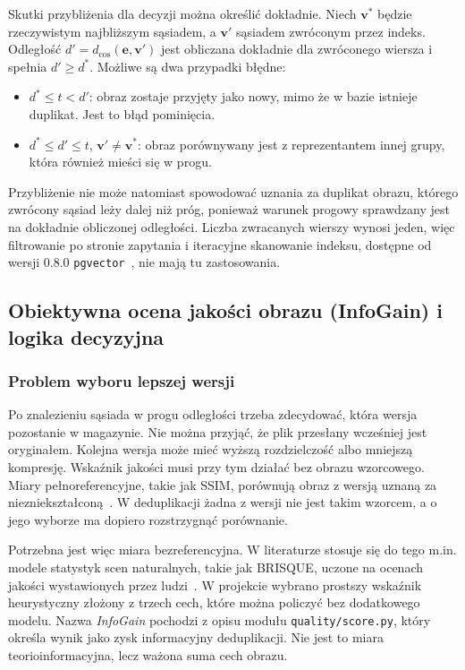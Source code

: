 Skutki przybliżenia dla decyzji można określić dokładnie. Niech
\(\mathbf{v}^{*}\) będzie rzeczywistym najbliższym sąsiadem, a
\(\mathbf{v}'\) sąsiadem zwróconym przez indeks. Odległość
\(d'=d_{\cos}(\mathbf{e},\mathbf{v}')\) jest obliczana dokładnie
dla zwróconego wiersza i spełnia \(d'\geq d^{*}\). Możliwe są dwa
przypadki błędne:

\begin{itemize}
    \item \(d^{*}\leq t<d'\): obraz zostaje przyjęty jako nowy, mimo że
    w bazie istnieje duplikat. Jest to błąd pominięcia.
    \item \(d^{*}\leq d'\leq t\), \(\mathbf{v}'\neq\mathbf{v}^{*}\):
    obraz porównywany jest z reprezentantem innej grupy, która również
    mieści się w progu.
\end{itemize}

Przybliżenie nie może natomiast spowodować uznania za duplikat
obrazu, którego zwrócony sąsiad leży dalej niż próg, ponieważ warunek
progowy sprawdzany jest na dokładnie obliczonej odległości.
Liczba zwracanych wierszy wynosi jeden, więc filtrowanie po stronie
zapytania i iteracyjne skanowanie indeksu, dostępne od wersji 0.8.0
\texttt{pgvector}~\cite{pgvector_docs}, nie mają tu zastosowania.

\subsection{Obiektywna ocena jakości obrazu (InfoGain) i logika
decyzyjna}
\label{sec:infogain-jakosc}

\subsubsection{Problem wyboru lepszej wersji}

Po znalezieniu sąsiada w progu odległości trzeba zdecydować, która
wersja pozostanie w magazynie. Nie można przyjąć, że plik przesłany
wcześniej jest oryginałem. Kolejna wersja może mieć wyższą
rozdzielczość albo mniejszą kompresję. Wskaźnik jakości musi przy tym
działać bez obrazu wzorcowego. Miary pełnoreferencyjne, takie jak
SSIM, porównują obraz z wersją uznaną za
niezniekształconą~\cite{wang2004ssim}. W deduplikacji żadna z wersji
nie jest takim wzorcem, a o jego wyborze ma dopiero rozstrzygnąć
porównanie.

Potrzebna jest więc miara bezreferencyjna. W literaturze stosuje się
do tego m.in. modele statystyk scen naturalnych, takie jak BRISQUE,
uczone na ocenach jakości wystawionych przez
ludzi~\cite{mittal2012brisque}. W projekcie wybrano prostszy
wskaźnik heurystyczny złożony z trzech cech, które można policzyć
bez dodatkowego modelu. Nazwa \textit{InfoGain} pochodzi z opisu
modułu \texttt{quality/score.py}, który określa wynik jako zysk
informacyjny deduplikacji. Nie jest to miara teorioinformacyjna,
lecz ważona suma cech obrazu.

